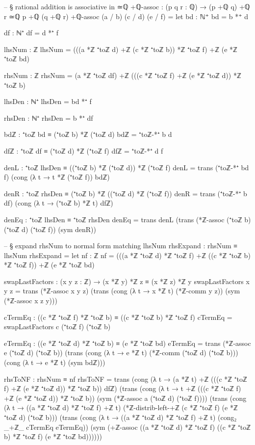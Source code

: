 \documentclass[11pt,a4paper]{book}
\begin{document}
\begin{code}
-- § rational addition is associative in ≃ℚ
+ℚ-assoc : (p q r : ℚ) → (p +ℚ q) +ℚ r ≃ℚ p +ℚ (q +ℚ r)
+ℚ-assoc (a / b) (c / d) (e / f) =
  let
    bd : ℕ⁺
    bd = b *⁺ d

    df : ℕ⁺
    df = d *⁺ f

    lhsNum : ℤ
    lhsNum = (((a *ℤ ⁺toℤ d) +ℤ (c *ℤ ⁺toℤ b)) *ℤ ⁺toℤ f) +ℤ (e *ℤ ⁺toℤ bd)

    rhsNum : ℤ
    rhsNum = (a *ℤ ⁺toℤ df) +ℤ (((c *ℤ ⁺toℤ f) +ℤ (e *ℤ ⁺toℤ d)) *ℤ ⁺toℤ b)

    lhsDen : ℕ⁺
    lhsDen = bd *⁺ f

    rhsDen : ℕ⁺
    rhsDen = b *⁺ df

    bdℤ : ⁺toℤ bd ≡ (⁺toℤ b) *ℤ (⁺toℤ d)
    bdℤ = ⁺toℤ-*⁺ b d

    dfℤ : ⁺toℤ df ≡ (⁺toℤ d) *ℤ (⁺toℤ f)
    dfℤ = ⁺toℤ-*⁺ d f

    denL : ⁺toℤ lhsDen ≡ ((⁺toℤ b) *ℤ (⁺toℤ d)) *ℤ (⁺toℤ f)
    denL =
      trans
        (⁺toℤ-*⁺ bd f)
        (cong (λ t → t *ℤ (⁺toℤ f)) bdℤ)

    denR : ⁺toℤ rhsDen ≡ (⁺toℤ b) *ℤ ((⁺toℤ d) *ℤ (⁺toℤ f))
    denR =
      trans
        (⁺toℤ-*⁺ b df)
        (cong (λ t → (⁺toℤ b) *ℤ t) dfℤ)

    denEq : ⁺toℤ lhsDen ≡ ⁺toℤ rhsDen
    denEq =
      trans
        denL
        (trans
          (*ℤ-assoc (⁺toℤ b) (⁺toℤ d) (⁺toℤ f))
          (sym denR))

    -- § expand rhsNum to normal form matching lhsNum
    rhsExpand : rhsNum ≡ lhsNum
    rhsExpand =
      let
        nf : ℤ
        nf = (((a *ℤ ⁺toℤ d) *ℤ ⁺toℤ f) +ℤ ((c *ℤ ⁺toℤ b) *ℤ ⁺toℤ f)) +ℤ (e *ℤ ⁺toℤ bd)

        swapLastFactors : (x y z : ℤ) → (x *ℤ y) *ℤ z ≡ (x *ℤ z) *ℤ y
        swapLastFactors x y z =
          trans
            (*ℤ-assoc x y z)
            (trans
              (cong (λ t → x *ℤ t) (*ℤ-comm y z))
              (sym (*ℤ-assoc x z y)))

        cTermEq : ((c *ℤ ⁺toℤ f) *ℤ ⁺toℤ b) ≡ ((c *ℤ ⁺toℤ b) *ℤ ⁺toℤ f)
        cTermEq = swapLastFactors c (⁺toℤ f) (⁺toℤ b)

        eTermEq : ((e *ℤ ⁺toℤ d) *ℤ ⁺toℤ b) ≡ (e *ℤ ⁺toℤ bd)
        eTermEq =
          trans
            (*ℤ-assoc e (⁺toℤ d) (⁺toℤ b))
            (trans
              (cong (λ t → e *ℤ t) (*ℤ-comm (⁺toℤ d) (⁺toℤ b)))
              (cong (λ t → e *ℤ t) (sym bdℤ)))

        rhsToNF : rhsNum ≡ nf
        rhsToNF =
          trans
            (cong (λ t → (a *ℤ t) +ℤ (((c *ℤ ⁺toℤ f) +ℤ (e *ℤ ⁺toℤ d)) *ℤ ⁺toℤ b)) dfℤ)
            (trans
              (cong (λ t → t +ℤ (((c *ℤ ⁺toℤ f) +ℤ (e *ℤ ⁺toℤ d)) *ℤ ⁺toℤ b))
                (sym (*ℤ-assoc a (⁺toℤ d) (⁺toℤ f))))
              (trans
                (cong (λ t → ((a *ℤ ⁺toℤ d) *ℤ ⁺toℤ f) +ℤ t)
                  (*ℤ-distrib-left-+ℤ (c *ℤ ⁺toℤ f) (e *ℤ ⁺toℤ d) (⁺toℤ b)))
                (trans
                  (cong (λ t → ((a *ℤ ⁺toℤ d) *ℤ ⁺toℤ f) +ℤ t)
                    (cong₂ _+ℤ_ cTermEq eTermEq))
                  (sym (+ℤ-assoc ((a *ℤ ⁺toℤ d) *ℤ ⁺toℤ f) ((c *ℤ ⁺toℤ b) *ℤ ⁺toℤ f) (e *ℤ ⁺toℤ bd))))))


\end{code}
\end{document}
